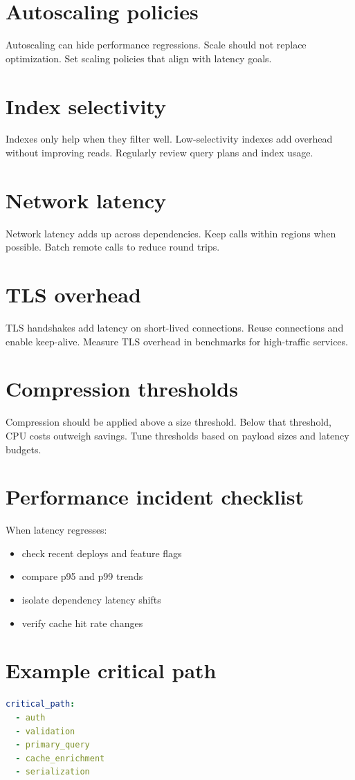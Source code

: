 \section{Autoscaling policies}
Autoscaling can hide performance regressions.
Scale should not replace optimization.
Set scaling policies that align with latency goals.

\section{Index selectivity}
Indexes only help when they filter well.
Low-selectivity indexes add overhead without improving reads.
Regularly review query plans and index usage.

\section{Network latency}
Network latency adds up across dependencies.
Keep calls within regions when possible.
Batch remote calls to reduce round trips.

\section{TLS overhead}
TLS handshakes add latency on short-lived connections.
Reuse connections and enable keep-alive.
Measure TLS overhead in benchmarks for high-traffic services.

\section{Compression thresholds}
Compression should be applied above a size threshold.
Below that threshold, CPU costs outweigh savings.
Tune thresholds based on payload sizes and latency budgets.

\section{Performance incident checklist}
When latency regresses:
\begin{itemize}[nosep]
  \item check recent deploys and feature flags
  \item compare p95 and p99 trends
  \item isolate dependency latency shifts
  \item verify cache hit rate changes
\end{itemize}

\section{Example critical path}
\begin{lstlisting}[language=YAML]
critical_path:
  - auth
  - validation
  - primary_query
  - cache_enrichment
  - serialization
\end{lstlisting}

